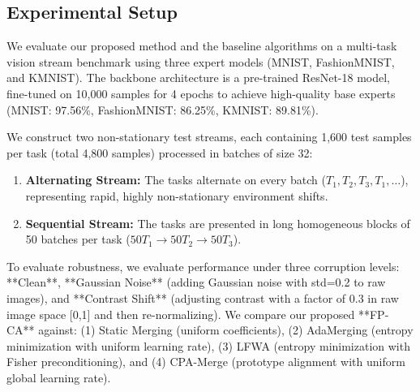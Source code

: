 \documentclass{article}
\theoremstyle{plain}
\theoremstyle{definition}
\theoremstyle{remark}
\begin{document}
\subsection{Experimental Setup}
We evaluate our proposed method and the baseline algorithms on a multi-task vision stream benchmark using three expert models (MNIST, FashionMNIST, and KMNIST). The backbone architecture is a pre-trained ResNet-18 model, fine-tuned on 10,000 samples for 4 epochs to achieve high-quality base experts (MNIST: 97.56\%, FashionMNIST: 86.25\%, KMNIST: 89.81\%).

We construct two non-stationary test streams, each containing 1,600 test samples per task (total 4,800 samples) processed in batches of size 32:
\begin{enumerate}
  \item \textbf{Alternating Stream:} The tasks alternate on every batch ($T_1, T_2, T_3, T_1, \dots$), representing rapid, highly non-stationary environment shifts.
  \item \textbf{Sequential Stream:} The tasks are presented in long homogeneous blocks of 50 batches per task ($50 T_1 \to 50 T_2 \to 50 T_3$).
\end{enumerate}

To evaluate robustness, we evaluate performance under three corruption levels: **Clean**, **Gaussian Noise** (adding Gaussian noise with std=0.2 to raw images), and **Contrast Shift** (adjusting contrast with a factor of 0.3 in raw image space [0,1] and then re-normalizing). We compare our proposed **FP-CA** against: (1) Static Merging (uniform coefficients), (2) AdaMerging (entropy minimization with uniform learning rate), (3) LFWA (entropy minimization with Fisher preconditioning), and (4) CPA-Merge (prototype alignment with uniform global learning rate).
\end{document}
